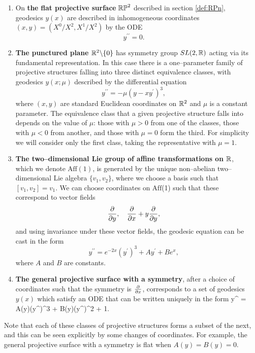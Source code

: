 \begin{enumerate}
\item On {\bf the flat projective surface} $\mathbb{RP}^2$ described in section \ref{def:RPn}, geodesics $y(x)$ are described in inhomogeneous coordinates $(x,y)=({X^0}/{X^2},{X^1}/{X^2})$ by the ODE
\[
y^{\prime\prime}=0.
\]
\item {\bf The punctured plane $\mathbb{R}^2\backslash\{0\}$} has symmetry group $SL(2,\mathbb{R})$ acting via its fundamental representation. In this case there is a one--parameter family of projective structures falling into three distinct equivalence classes, with geodesics $y(x;\mu)$ described by the differential equation
\[
y^{\prime\prime} = -\mu(y-xy^\prime)^3,
\]
where $(x,y)$ are standard Euclidean coordinates on $\mathbb{R}^2$ and $\mu$ is a constant parameter. The equivalence class that a given projective structure falls into depends on the value of $\mu$: those with $\mu>0$ from one of the classes, those with $\mu<0$ from another, and those with $\mu=0$ form the third. For simplicity we will consider only the first class, taking the representative with $\mu=1$.
\item {\bf The two--dimensional Lie group of affine transformations on $\mathbb{R}$}, which we denote $\mathrm{Aff}(1)$, is generated by the unique non--abelian two--dimensional Lie algebra $\{v_1,v_2\}$, where we choose a basis such that $[v_1,v_2]=v_1$. We can choose coordinates on $\mathrm{Aff}$(1) such that these correspond to vector fields
\[
\frac{\partial}{\partial y},\quad \frac{\partial}{\partial x} + y\frac{\partial}{\partial y},
\]
and using invariance under these vector fields, the geodesic equation can be cast in the form \cite{FLL}
\[
y^{\prime\prime} = e^{-2x}(y^\prime)^3 + Ay^\prime + Be^x,
\]
where $A$ and $B$ are constants.
\item {\bf The general projective surface with a symmetry}, after a choice of coordinates such that the symmetry is $\frac{\partial}{\partial x}$, corresponds to a set of geodesics $y(x)$ which satisfy an ODE that can be written uniquely in the form \cite{FLL}
\be \label{eq:1symode}
y^{\prime\prime} = A(y)(y^\prime)^3 + B(y)(y^\prime)^2 + 1.
\ee
\end{enumerate}

Note that each of these classes of projective structures forms a subset of the next, and this can be seen explicitly by some changes of coordinates. For example, the general projective surface with a symmetry is flat when $A(y)=B(y)=0$.

